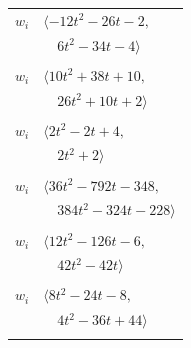 \documentclass[11pt]{article}
\begin{document}
\begin{longtable}{@{}ll@{}}
$w_i$ & $\langle -12t^{2}-26t-2,$\\
 & $\quad 6t^{2}-34t-4\rangle$\\
\addlinespace[2pt]
\multicolumn{2}{@{}p{0.97\textwidth}@{}}{$i=11$, $D_i=1$, $\rho_{ij}$: $0{:}2, \allowbreak 1{:}2, \allowbreak 4{:}2, \allowbreak 18{:}1, \allowbreak 24{:}2, \allowbreak 28{:}1, \allowbreak 35{:}1, \allowbreak 43{:}2$}\\
$w_i$ & $\langle 10t^{2}+38t+10,$\\
 & $\quad 26t^{2}+10t+2\rangle$\\
\addlinespace[2pt]
\multicolumn{2}{@{}p{0.97\textwidth}@{}}{$i=12$, $D_i=1$, $\rho_{ij}$: $22{:}2, \allowbreak 25{:}2, \allowbreak 29{:}2, \allowbreak 38{:}1, \allowbreak 44{:}1$}\\
$w_i$ & $\langle 2t^{2}-2t+4,$\\
 & $\quad 2t^{2}+2\rangle$\\
\addlinespace[2pt]
\multicolumn{2}{@{}p{0.97\textwidth}@{}}{$i=13$, $D_i=1$, $\rho_{ij}$: $0{:}2, \allowbreak 8{:}2, \allowbreak 17{:}1, \allowbreak 19{:}1, \allowbreak 24{:}1, \allowbreak 26{:}2, \allowbreak 32{:}2, \allowbreak 34{:}2, \allowbreak 35{:}2, \allowbreak 36{:}2, \allowbreak 39{:}1, \allowbreak 41{:}1, \allowbreak 46{:}2$}\\
$w_i$ & $\langle 36t^{2}-792t-348,$\\
 & $\quad 384t^{2}-324t-228\rangle$\\
\addlinespace[2pt]
\multicolumn{2}{@{}p{0.97\textwidth}@{}}{$i=14$, $D_i=1$, $\rho_{ij}$: $3{:}1, \allowbreak 4{:}1, \allowbreak 5{:}2, \allowbreak 17{:}1, \allowbreak 20{:}1, \allowbreak 22{:}1, \allowbreak 27{:}2, \allowbreak 29{:}2, \allowbreak 33{:}2, \allowbreak 46{:}2$}\\
$w_i$ & $\langle 12t^{2}-126t-6,$\\
 & $\quad 42t^{2}-42t\rangle$\\
\addlinespace[2pt]
\multicolumn{2}{@{}p{0.97\textwidth}@{}}{$i=15$, $D_i=1$, $\rho_{ij}$: $0{:}1, \allowbreak 2{:}2, \allowbreak 3{:}2, \allowbreak 22{:}2, \allowbreak 37{:}1, \allowbreak 39{:}2, \allowbreak 41{:}1$}\\
$w_i$ & $\langle 8t^{2}-24t-8,$\\
 & $\quad 4t^{2}-36t+44\rangle$\\
\addlinespace[2pt]
\multicolumn{2}{@{}p{0.97\textwidth}@{}}{$i=16$, $D_i=1$, $\rho_{ij}$: $0{:}2, \allowbreak 1{:}2, \allowbreak 23{:}2, \allowbreak 32{:}2, \allowbreak 33{:}2, \allowbreak 35{:}2, \allowbreak 38{:}1, \allowbreak 42{:}2$}\\

\end{longtable}
\end{document}
